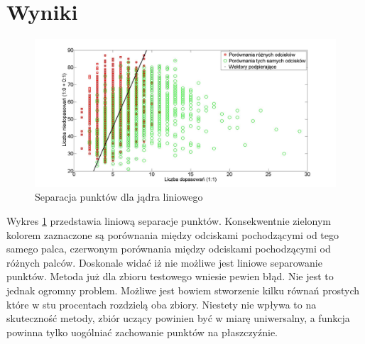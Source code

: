 \section [Wyniki][Wyniki]{Wyniki}
\begin{figure}[!htb]
    \begin{center}
		\includegraphics[angle=0,scale=0.27]{img/SVM_linear_code_1.jpg}
		\caption{Separacja punktów dla jądra liniowego}
		\label{img:SVM_linear_code_1}
    \end{center}
\end{figure} 

Wykres \ref{img:SVM_linear_code_1} przedstawia liniową separacje punktów. Konsekwentnie zielonym kolorem zaznaczone są porównania między odciskami pochodzącymi od tego samego palca, czerwonym porównania między odciskami pochodzącymi od różnych palców. Doskonale widać iż nie możliwe jest liniowe separowanie punktów. Metoda już dla zbioru testowego wniesie pewien błąd. Nie jest to jednak ogromny problem. Możliwe jest bowiem stworzenie kilku równań prostych które w stu procentach rozdzielą oba zbiory. Niestety nie wpływa to na skuteczność metody, zbiór uczący powinien być w miarę uniwersalny, a funkcja powinna tylko uogólniać zachowanie punktów na płaszczyźnie. 

